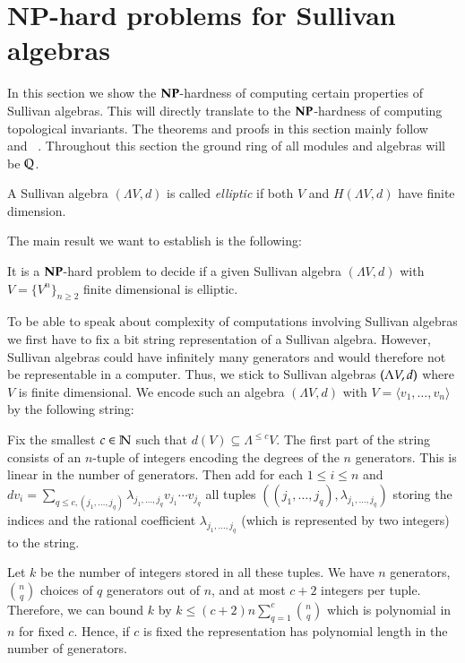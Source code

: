  \section{NP-hard problems for Sullivan algebras}\label{sec:NPSullivan}
 
 In this section we show the 
 $\mathbf{NP}$-hardness of computing certain properties of Sullivan algebras. This will directly 
 translate to the $\mathbf{NP}$-hardness of computing topological invariants.
 The theorems and proofs in this section mainly follow~\cite{Lechuga2000} and
~\cite{Garvin2003}. Throughout this section the ground ring of all modules and algebras
 will be $\mathbb{Q}$.


 \begin{Definition}
  A Sullivan algebra $(\Lambda V, d)$ is called \emph{elliptic} if both $V$ and $H(\Lambda V,d)$ have
  finite dimension.
 \end{Definition}
 
 The main result we want to establish is the following:
 
 \begin{Theorem}
\label{thm:DecidingEllipticityIsNpHard}
  It is a $\mathbf{NP}$-hard problem to decide if a given Sullivan algebra $(\Lambda V,d)$ with $V = { \{ V^n \} }_{n \geq 2}  $ finite dimensional 
  is elliptic. 
 \end{Theorem}
 
 \begin{Remark}
\label{rem:CodingOfSullivanAlgebras}
  To be able to speak about complexity of computations involving Sullivan algebras we first have to fix a bit string 
  representation of a Sullivan algebra. However, Sullivan algebras could have infinitely many generators and would therefore
  not be representable in a computer. Thus, we stick to Sullivan algebras $(\Lambda V,d)$ where $V$ is finite dimensional. 
  We encode such an algebra $(\Lambda V, d)$ with $V = \langle v_1, \ldots , v_n \rangle$
  by the following string: 
  
  Fix the smallest $c \in \mathbb{N}$ such that $d(V) \subseteq \Lambda^{ \leq c} V$.
  The first part of the string consists of 
  an $n$-tuple of integers encoding the degrees of the $n$ generators. This is linear in the number
  of generators. Then add for each $ 1 \leq i \leq n$
  and $d v_i = \sum_{q \leq c, (j_1, \ldots, j_q)} \lambda_{j_1, \ldots, j_q} v_{j_1} \cdots v_{j_q}$ all tuples 
  $(({j_1, \ldots, j_q}), \lambda_{j_1, \ldots, j_q})$ storing the indices and the rational coefficient 
  $\lambda_{j_1, \ldots, j_q}$ (which is represented by two integers) to the string.
  
  Let $k$ be the number of integers stored in all these tuples. We have $n$ generators,
  ${ n \choose q}$ choices of $q$ generators out of $n$, and at most $c + 2$ integers per tuple. Therefore, we can bound $k$ by
  $k \leq (c + 2)n \sum_{q = 1}^c { n \choose q} $ which is polynomial in $n$ for fixed $c$.
  Hence, if $c$ is fixed the representation has polynomial length in the number
  of generators.
  
 \end{Remark}

